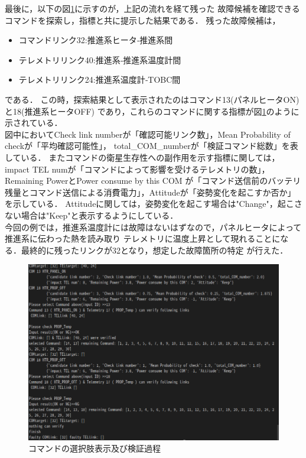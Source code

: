 \documentclass[11pt]{jsreport}
\begin{document}
最後に，以下の図\ref{fig:COM_candidate}に示すのが，上記の流れを経て残った
故障候補を確認できるコマンドを探索し，指標と共に提示した結果である．
残った故障候補は，
\begin{itemize}
   \item コマンドリンク32:推進系ヒータ‐推進系間
   \item テレメトリリンク40:推進系‐推進系温度計間
   \item テレメトリリンク24:推進系温度計‐TOBC間   
\end{itemize}
である．
この時，探索結果として表示されたのはコマンド13(パネルヒータON)と18(推進系ヒータOFF)
であり，これらのコマンドに関する指標が図\ref{fig:COM_candidate}のように示されている．\\
図中においてCheck link numberが「確認可能リンク数」，Mean Probability of checkが「平均確認可能性」，
total\_COM\_numberが「検証コマンド総数」を表している．
またコマンドの衛星生存性への副作用を示す指標に関しては，
impact TEL numが「コマンドによって影響を受けるテレメトリの数」，Remaining PowerとPower consume by this COM
が「コマンド送信前のバッテリ残量とコマンド送信による消費電力」，Attitudeが「姿勢変化を起こすか否か」を示している．
Attitudeに関しては，姿勢変化を起こす場合は"Change"，起こさない場合は"Keep"と表示するようにしている．\\
今回の例では，推進系温度計には故障はないはずなので，パネルヒータによって推進系に伝わった熱を読み取り
テレメトリに温度上昇として現れることになる．最終的に残ったリンクが32となり，想定した故障箇所の特定
が行えた．
\begin{figure}[H]
   \centering
      \includegraphics[width=15.0cm]{figure/COM14_TEL17_COM_phase.png}
      \caption{コマンドの選択肢表示及び検証過程}
      \label{fig:COM_candidate}
\end{figure}
\end{document}
